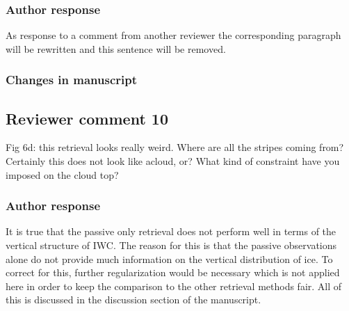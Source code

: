 \subsubsection*{Author response}

As response to a comment from another reviewer the corresponding paragraph will be
rewritten and this sentence will be removed.

\subsubsection*{Changes in manuscript}

\begin{change}[310]
\end{change}



\subsection*{Reviewer comment 10}

 Fig 6d: this retrieval looks really weird. Where are all the stripes coming
 from? Certainly this does not look like acloud, or? What kind of constraint
 have you imposed on the cloud top?

\subsubsection*{Author response}

It is true that the passive only retrieval does not perform well in terms of the
vertical structure of IWC. The reason for this is that the passive observations
alone do not provide much information on the vertical distribution of ice. To
correct for this, further regularization would be necessary which is not applied
here in order to keep the comparison to the other retrieval methods fair. All of
this is discussed in the discussion section of the manuscript.

